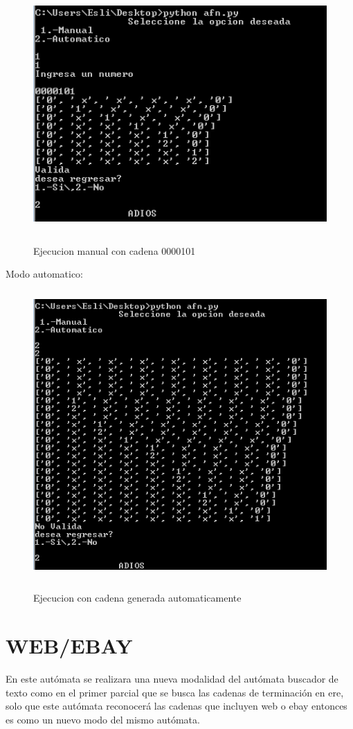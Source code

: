 \documentclass[12pt]{article}
\begin{document}
\begin{figure}[H]
\includegraphics[width=\textwidth, height=9cm]{manual_afn}
\label{fig:manual_afn}
\caption{Ejecucion manual con cadena 0000101}
\end{figure}

Modo automatico:

\begin{figure}[H]
\includegraphics[width=\textwidth, height=11cm]{auto_afn}
\label{fig:manual_afn}
\caption{Ejecucion con cadena generada automaticamente }
\end{figure}

\newpage
\section{WEB/EBAY}
En este autómata se realizara una nueva modalidad del autómata buscador de texto como en el primer parcial que se busca las cadenas de terminación en ere, solo que este autómata reconocerá las cadenas que incluyen web o ebay entonces es como un nuevo modo del mismo autómata.
\end{document}
